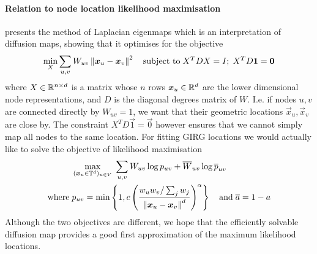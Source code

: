 \paragraph{Relation to node location likelihood maximisation}
\cite{belkin2001laplacian} presents the method of Laplacian eigenmaps which is an interpretation of diffusion maps, showing that it optimises for the objective
\begin{equation}
  \min_{X} \sum_{u, v} W_{uv} \left\lVert \bm{x}_u - \bm{x}_v\right\rVert^2 \quad \text{subject to}\; X^T D X = I;\; X^T D\bm{1} = \bm{0} 
\end{equation}
where $X \in \mathbb{R}^{n \times d}$ is a  matrix whose $n$ rows $\bm{x}_u \in \mathbb{R}^d$ are the lower dimensional node representations, and $D$ is the diagonal degrees matrix of $W$. I.e. if nodes $u, v$ are connected directly by $W_{uv} = 1$, we want that their geometric locations $\vec{x}_u, \vec{x}_v$ are close by. The constraint $X^T D \vec{1} = \vec{0}$ however ensures that we cannot simply map all nodes to the same location.
For fitting GIRG locations we would actually like to solve the objective of likelihood maximisation
\begin{align}
  &\max\limits_{(\bm{x}_u \in \mathbb{T}^d)_{u \in V}} \;
  \sum_{u, v} W_{uv} \log p_{uv} + \overline{W}_{uv} \log \overline{p}_{uv}
  \\
  \text{where}\;
  &p_{uv} = \min \left \{
    1, c \left ( \frac{w_u w_v / \sum_j w_j}{\left\lVert \bm{x}_u - \bm{x}_v\right\rVert^d} \right )^\alpha
  \right \}
  \quad \text{and}\;
  \overline{a} = 1 - a
\end{align}
Although the two objectives are different, we hope that the efficiently solvable diffusion map provides a good first approximation of the maximum likelihood locations.





